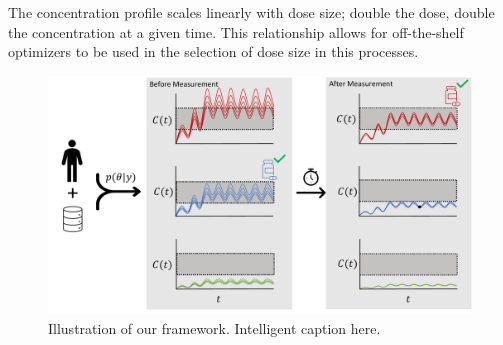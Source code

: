 The concentration profile scales linearly with dose size; double the dose, double the concentration at a given time.  This relationship allows for off-the-shelf optimizers to be used in the selection of dose size in this processes.

\begin{figure}
	\centering
	\includegraphics[width=0.85\linewidth]{figures/process_figure_single}
	\caption{Illustration of our framework.  Intelligent caption here.}
	\label{fig:processfiguresingle}
\end{figure}

